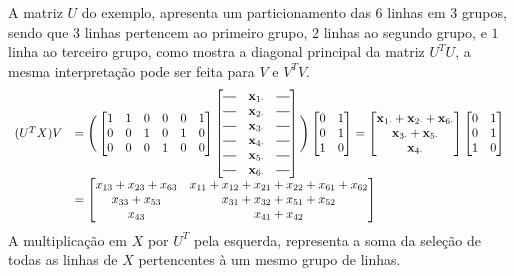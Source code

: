 \documentclass[
    12pt,                %
    oneside,            %
    a4paper,            %
    english,            %
    brazil                %
    ]{abntex2ppgsi}
\newcommand*{\horzbar}{\rule[.5ex]{2.5ex}{0.5pt}}
\begin{document}
A matriz $U$ do exemplo, apresenta um particionamento das $6$ linhas em $3$ grupos, sendo que $3$ linhas pertencem ao primeiro grupo, $2$ linhas ao segundo grupo, e $1$ linha ao terceiro grupo, como mostra a diagonal principal da matriz $U^T U$, a mesma interpretação pode ser feita para $V$ e $V^T V$.
\[
\begin{array}{ll}
(U^T X) V & = \Bigg(\begin{bmatrix}
1 & 1 & 0 & 0 & 0 & 1 \\
0 & 0 & 1 & 0 & 1 & 0 \\
0 & 0 & 0 & 1 & 0 & 0
\end{bmatrix}
\begin{bmatrix}
\horzbar & \mathbf{x}_{1 \cdot} & \horzbar \\
\horzbar & \mathbf{x}_{2 \cdot} & \horzbar \\
\horzbar & \mathbf{x}_{3 \cdot} & \horzbar \\
\horzbar & \mathbf{x}_{4 \cdot} & \horzbar \\
\horzbar & \mathbf{x}_{5 \cdot} & \horzbar \\
\horzbar & \mathbf{x}_{6 \cdot} & \horzbar
\end{bmatrix}\Bigg)
\begin{bmatrix}
0 & 1 \\
0 & 1 \\
1 & 0
\end{bmatrix}
= \begin{bmatrix}
\mathbf{x}_{1 \cdot} + \mathbf{x}_{2 \cdot} + \mathbf{x}_{6 \cdot} \\
\mathbf{x}_{3 \cdot} + \mathbf{x}_{5 \cdot}                        \\
\mathbf{x}_{4 \cdot}
\end{bmatrix}
\begin{bmatrix}
0 & 1 \\
0 & 1 \\
1 & 0
\end{bmatrix} \\
& = \begin{bmatrix}
x_{13} + x_{23} + x_{63} & x_{11} + x_{12} + x_{21} + x_{22} + x_{61} + x_{62} \\
x_{33} + x_{53}          & x_{31} + x_{32} + x_{51} + x_{52}                   \\
x_{43}                   & x_{41} + x_{42}
\end{bmatrix}
\end{array}
\]
A multiplicação em $X$ por $U^T$ pela esquerda, representa a soma da seleção de todas as linhas de $X$ pertencentes à um mesmo grupo de linhas.
\end{document}
